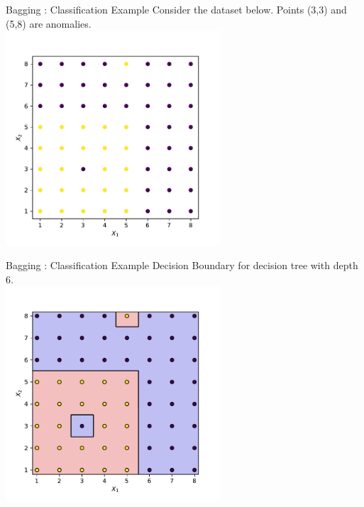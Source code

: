 \documentclass{beamer}
\begin{document}
	\begin{frame}{Bagging : Classification Example}
	Consider the dataset below. Points (3,3) and (5,8) are anomalies.\\
	\vspace{0.5cm}
	\centering
	\includegraphics[width = 0.6\textwidth]{dataset}
	\end{frame}


	\begin{frame}{Bagging : Classification Example}
	Decision Boundary for decision tree with depth 6.\\
	\vspace{0.5cm}
	\centering
	\includegraphics[width = 0.6\textwidth]{strong-tree}
	\end{frame}
\end{document}
